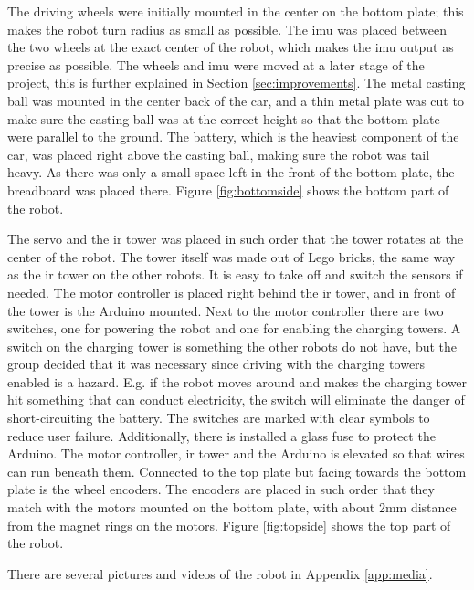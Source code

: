 The driving wheels were initially mounted in the center on the bottom plate; this makes the robot turn radius as small as possible. The \acrshort{imu} was placed between the two wheels at the exact center of the robot, which makes the \acrshort{imu} output as precise as possible. The wheels and \acrshort{imu} were moved at a later stage of the project, this is further explained in Section \ref{sec:improvements}. The metal casting ball was mounted in the center back of the car, and a thin metal plate was cut to make sure the casting ball was at the correct height so that the bottom plate were parallel to the ground. The battery, which is the heaviest component of the car, was placed right above the casting ball, making sure the robot was tail heavy. As there was only a small space left in the front of the bottom plate, the breadboard was placed there. Figure \ref{fig:bottomside} shows the bottom part of the robot.

The servo and the \acrshort{ir} tower was placed in such order that the tower rotates at the center of the robot. The tower itself was made out of Lego bricks, the same way as the \acrshort{ir} tower on the other robots. It is easy to take off and switch the sensors if needed. The motor controller is placed right behind the \acrshort{ir} tower, and in front of the tower is the Arduino mounted. Next to the motor controller there are two switches, one for powering the robot and one for enabling the charging towers. A switch on the charging tower is something the other robots do not have, but the group decided that it was necessary since driving with the charging towers enabled is a hazard. E.g. if the robot moves around and makes the charging tower hit something that can conduct electricity, the switch will eliminate the danger of short-circuiting the battery. The switches are marked with clear symbols to reduce user failure. Additionally, there is installed a glass fuse to protect the Arduino. The motor controller, \acrshort{ir} tower and the Arduino is elevated so that wires can run beneath them. Connected to the top plate but facing towards the bottom plate is the wheel encoders. The encoders are placed in such order that they match with the motors mounted on the bottom plate, with about 2mm distance from the magnet rings on the motors. Figure \ref{fig:topside} shows the top part of the robot.

There are several pictures and videos of the robot in Appendix \ref{app:media}.



